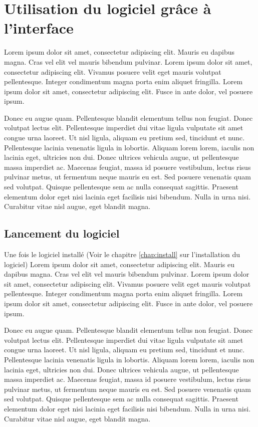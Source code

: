 \chapter{Utilisation du logiciel grâce à l'interface}\label{chap:usegraph}
Lorem ipsum dolor sit amet, consectetur adipiscing elit. Mauris eu dapibus magna. Cras vel elit vel mauris bibendum pulvinar. Lorem ipsum dolor sit amet, consectetur adipiscing elit. Vivamus posuere velit eget mauris volutpat pellentesque. Integer condimentum magna porta enim aliquet fringilla. Lorem ipsum dolor sit amet, consectetur adipiscing elit. Fusce in ante dolor, vel posuere ipsum.

Donec eu augue quam. Pellentesque blandit elementum tellus non feugiat. Donec volutpat lectus elit. Pellentesque imperdiet dui vitae ligula vulputate sit amet congue urna laoreet. Ut nisl ligula, aliquam eu pretium sed, tincidunt et nunc. Pellentesque lacinia venenatis ligula in lobortis. Aliquam lorem lorem, iaculis non lacinia eget, ultricies non dui. Donec ultrices vehicula augue, ut pellentesque massa imperdiet ac. Maecenas feugiat, massa id posuere vestibulum, lectus risus pulvinar metus, ut fermentum neque mauris eu est. Sed posuere venenatis quam sed volutpat. Quisque pellentesque sem ac nulla consequat sagittis. Praesent elementum dolor eget nisi lacinia eget facilisis nisi bibendum. Nulla in urna nisi. Curabitur vitae nisl augue, eget blandit magna. 
\section{Lancement du logiciel}
Une fois le logiciel installé (Voir le chapitre \ref{chap:install} sur l'installation du logiciel) 
Lorem ipsum dolor sit amet, consectetur adipiscing elit. Mauris eu dapibus magna. Cras vel elit vel mauris bibendum pulvinar. Lorem ipsum dolor sit amet, consectetur adipiscing elit. Vivamus posuere velit eget mauris volutpat pellentesque. Integer condimentum magna porta enim aliquet fringilla. Lorem ipsum dolor sit amet, consectetur adipiscing elit. Fusce in ante dolor, vel posuere ipsum.

Donec eu augue quam. Pellentesque blandit elementum tellus non feugiat. Donec volutpat lectus elit. Pellentesque imperdiet dui vitae ligula vulputate sit amet congue urna laoreet. Ut nisl ligula, aliquam eu pretium sed, tincidunt et nunc. Pellentesque lacinia venenatis ligula in lobortis. Aliquam lorem lorem, iaculis non lacinia eget, ultricies non dui. Donec ultrices vehicula augue, ut pellentesque massa imperdiet ac. Maecenas feugiat, massa id posuere vestibulum, lectus risus pulvinar metus, ut fermentum neque mauris eu est. Sed posuere venenatis quam sed volutpat. Quisque pellentesque sem ac nulla consequat sagittis. Praesent elementum dolor eget nisi lacinia eget facilisis nisi bibendum. Nulla in urna nisi. Curabitur vitae nisl augue, eget blandit magna. 



